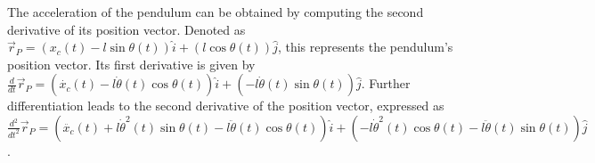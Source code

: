\documentclass[12pt]{article}
\newcommand{\colAwidth}{0.13\textwidth}
\newcommand{\colBwidth}{0.82\textwidth}
\newcounter{defnum} %
\newcommand{\ddref}[1]{DD\ref{#1}}
\newcommand{\aref}[1]{A\ref{#1}}
\begin{document}
The acceleration of the pendulum can be obtained by computing the 
second derivative of its position vector. Denoted as 
$\vec{r}_P = (x_c(t)-l\sin\theta(t))\hat{i} + (l\cos\theta(t)) \hat{j}$, 
this represents the pendulum's position vector. Its first derivative 
is given by $ \frac{d}{dt} \vec{r}_P = (\dot{x_c}(t)-l\dot{\theta}(t)\cos\theta(t))\hat{i} 
+ (-l\dot{\theta}(t)\sin\theta(t)) \hat{j}$. Further differentiation leads 
to the second derivative of the position vector, expressed as $\frac{d^2}{dt^2}
\vec{r}_P = (\ddot{x_c}(t)+l\dot{\theta}^2(t)\sin\theta(t)-l\ddot{\theta}(t)\cos\theta(t))\hat{i} 
+ (-l\dot{\theta}^2(t)\cos\theta(t) - l\ddot{\theta}(t)\sin\theta(t)) \hat{j}$.


\end{document}
